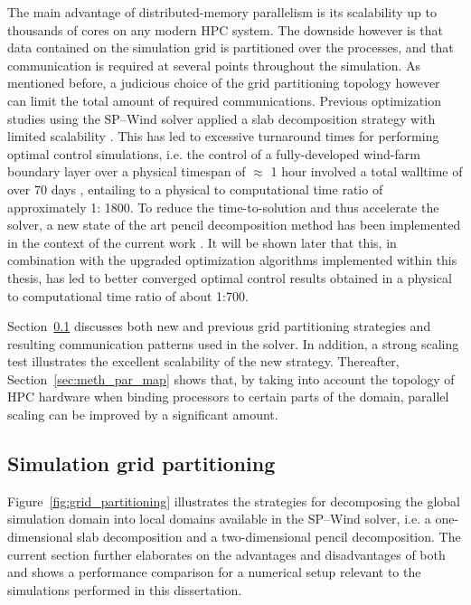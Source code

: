 The main advantage of distributed-memory parallelism is its scalability up to thousands of cores on any modern HPC system. The downside however is that data contained on the simulation grid is partitioned over the processes, and that communication is required at several points throughout the simulation. As mentioned before, a judicious choice of the grid partitioning topology however can limit the total amount of required communications. Previous optimization studies using the SP--Wind solver applied a slab decomposition strategy with limited scalability \citep{delport2009constrained, goit2015optimal}. This has led to excessive turnaround times for performing optimal control simulations, i.e. the control of a fully-developed wind-farm boundary layer over a physical timespan of $\approx$ 1 hour involved a total walltime of over 70 days \citep{goit2015optimal}, entailing to a physical to computational time ratio of approximately 1: 1800. To reduce the time-to-solution and thus accelerate the solver, a new state of the art pencil decomposition method has been implemented in the context of the current work \citep{li20102decomp}. It will be shown later that this, in combination with the upgraded optimization algorithms implemented within this thesis, has led to better converged optimal control results obtained in a physical to computational time ratio of about 1:700.

Section~\ref{sec:meth_par_part} discusses both new and previous grid partitioning strategies and resulting communication patterns used in the solver. In addition, a strong scaling test illustrates the excellent scalability of the new strategy. Thereafter, Section~\ref{sec:meth_par_map} shows that, by taking into account the topology of HPC hardware when binding processors to certain parts of the domain, parallel scaling can be improved by a significant amount.

\subsection{Simulation grid partitioning}\label{sec:meth_par_part}
Figure~\ref{fig:grid_partitioning} illustrates the strategies for decomposing the global simulation domain into local domains available in the SP--Wind solver, i.e. a one-dimensional slab decomposition and a two-dimensional pencil decomposition. The current section further elaborates on the advantages and disadvantages of both and shows a performance comparison for a numerical setup relevant to the simulations performed in this dissertation. 


